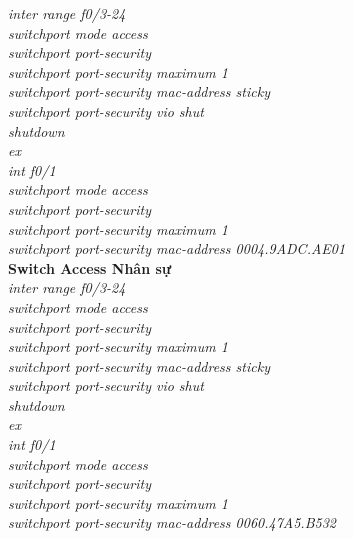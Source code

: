 \documentclass[a4paper, 12pt]{article}
\begin{document}
\hspace*{2cm}\textit{inter range f0/3-24\\
\hspace*{2cm}switchport mode access\\
\hspace*{2cm}switchport port-security\\
\hspace*{2cm}switchport port-security maximum 1\\
\hspace*{2cm}switchport port-security mac-address sticky\\
\hspace*{2cm}switchport port-security vio shut\\
\hspace*{2cm}shutdown\\
\hspace*{2cm}ex\\
\hspace*{2cm}int f0/1\\
\hspace*{2cm}switchport mode access\\
\hspace*{2cm}switchport port-security\\
\hspace*{2cm}switchport port-security maximum 1\\
\hspace*{2cm}switchport port-security mac-address 0004.9ADC.AE01\\}
\hspace*{1cm}\textbf{Switch Access Nhân sự}\\
\hspace*{2cm}\textit{inter range f0/3-24\\
\hspace*{2cm}switchport mode access\\
\hspace*{2cm}switchport port-security\\
\hspace*{2cm}switchport port-security maximum 1\\
\hspace*{2cm}switchport port-security mac-address sticky\\
\hspace*{2cm}switchport port-security vio shut\\
\hspace*{2cm}shutdown\\
\hspace*{2cm}ex\\
\hspace*{2cm}int f0/1\\
\hspace*{2cm}switchport mode access\\
\hspace*{2cm}switchport port-security\\
\hspace*{2cm}switchport port-security maximum 1\\
\hspace*{2cm}switchport port-security mac-address 0060.47A5.B532\\}
\end{document}
